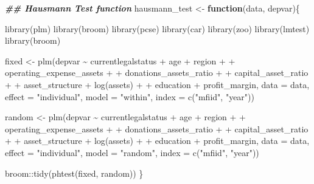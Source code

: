 \documentclass[a4paper,nobind]{templates/ociamthesis}
\newenvironment{Shaded}{\begin{snugshade}}{\end{snugshade}}
\newcommand{\AttributeTok}[1]{\textcolor[rgb]{0.77,0.63,0.00}{#1}}
\newcommand{\ControlFlowTok}[1]{\textcolor[rgb]{0.13,0.29,0.53}{\textbf{#1}}}
\newcommand{\DocumentationTok}[1]{\textcolor[rgb]{0.56,0.35,0.01}{\textbf{\textit{#1}}}}
\newcommand{\FunctionTok}[1]{\textcolor[rgb]{0.00,0.00,0.00}{#1}}
\newcommand{\NormalTok}[1]{#1}
\newcommand{\OtherTok}[1]{\textcolor[rgb]{0.56,0.35,0.01}{#1}}
\newcommand{\SpecialCharTok}[1]{\textcolor[rgb]{0.00,0.00,0.00}{#1}}
\newcommand{\StringTok}[1]{\textcolor[rgb]{0.31,0.60,0.02}{#1}}
\renewenvironment{Shaded}
{
  \vspace{10pt}%
  \begin{snugshade}%
}{%
  \end{snugshade}%
  \vspace{8pt}%
}
\begin{document}
\begin{Shaded}
\begin{Highlighting}[]
\DocumentationTok{\#\# Hausmann Test function}
\NormalTok{hausmann\_test }\OtherTok{\textless{}{-}} \ControlFlowTok{function}\NormalTok{(data, depvar)\{}
  
  \FunctionTok{library}\NormalTok{(plm)}
  \FunctionTok{library}\NormalTok{(broom)}
  \FunctionTok{library}\NormalTok{(pcse)}
  \FunctionTok{library}\NormalTok{(car)}
  \FunctionTok{library}\NormalTok{(zoo)}
  \FunctionTok{library}\NormalTok{(lmtest)}
  \FunctionTok{library}\NormalTok{(broom)}
  
\NormalTok{  fixed }\OtherTok{\textless{}{-}} \FunctionTok{plm}\NormalTok{(depvar }\SpecialCharTok{\textasciitilde{}}\NormalTok{ currentlegalstatus }\SpecialCharTok{+}\NormalTok{ age }\SpecialCharTok{+}\NormalTok{ region }\SpecialCharTok{+}
\SpecialCharTok{+}\NormalTok{           operating\_expense\_assets }\SpecialCharTok{+} 
\SpecialCharTok{+}\NormalTok{           donations\_assets\_ratio }\SpecialCharTok{+} 
\SpecialCharTok{+}\NormalTok{           capital\_asset\_ratio }\SpecialCharTok{+}
\SpecialCharTok{+}\NormalTok{           asset\_structure }\SpecialCharTok{+} \FunctionTok{log}\NormalTok{(assets) }\SpecialCharTok{+} 
\SpecialCharTok{+}\NormalTok{           education }\SpecialCharTok{+}\NormalTok{ profit\_margin, }
               \AttributeTok{data =}\NormalTok{ data, }\AttributeTok{effect =} \StringTok{"individual"}\NormalTok{, }\AttributeTok{model =} \StringTok{"within"}\NormalTok{, }
      \AttributeTok{index =} \FunctionTok{c}\NormalTok{(}\StringTok{"mfiid"}\NormalTok{, }\StringTok{"year"}\NormalTok{)) }
  
\NormalTok{  random }\OtherTok{\textless{}{-}} \FunctionTok{plm}\NormalTok{(depvar }\SpecialCharTok{\textasciitilde{}}\NormalTok{ currentlegalstatus }\SpecialCharTok{+}\NormalTok{ age }\SpecialCharTok{+}\NormalTok{ region }\SpecialCharTok{+}
\SpecialCharTok{+}\NormalTok{           operating\_expense\_assets }\SpecialCharTok{+} 
\SpecialCharTok{+}\NormalTok{           donations\_assets\_ratio }\SpecialCharTok{+} 
\SpecialCharTok{+}\NormalTok{           capital\_asset\_ratio }\SpecialCharTok{+}
\SpecialCharTok{+}\NormalTok{           asset\_structure }\SpecialCharTok{+} \FunctionTok{log}\NormalTok{(assets) }\SpecialCharTok{+} 
\SpecialCharTok{+}\NormalTok{           education }\SpecialCharTok{+}\NormalTok{ profit\_margin, }
          \AttributeTok{data =}\NormalTok{ data, }\AttributeTok{effect =} \StringTok{"individual"}\NormalTok{, }\AttributeTok{model =} \StringTok{"random"}\NormalTok{, }
      \AttributeTok{index =} \FunctionTok{c}\NormalTok{(}\StringTok{"mfiid"}\NormalTok{, }\StringTok{"year"}\NormalTok{))}
 
\NormalTok{  broom}\SpecialCharTok{::}\FunctionTok{tidy}\NormalTok{(}\FunctionTok{phtest}\NormalTok{(fixed, random))}
\NormalTok{\}}
\end{Highlighting}
\end{Shaded}
\end{document}
